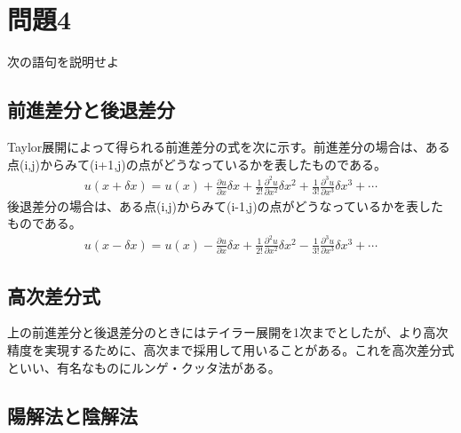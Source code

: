 \documentclass[a4j,twoside,openright,11pt]{jarticle}
\begin{document}
\section{問題4}
次の語句を説明せよ
\subsection{前進差分と後退差分}
Taylor展開によって得られる前進差分の式を次に示す。前進差分の場合は、ある点(i,j)からみて(i+1,j)の点がどうなっているかを表したものである。
\begin{eqnarray}
u(x+\delta x) = u(x) + \frac{\partial u}{\partial x}\delta x + \frac{1}{2!}\frac{\partial^2 u}{\partial x^2}\delta x^2 + \frac{1}{3!}\frac{\partial^3 u}{\partial x^3}\delta x^3 + \cdots
\end{eqnarray}
後退差分の場合は、ある点(i,j)からみて(i-1,j)の点がどうなっているかを表したものである。
\begin{eqnarray}
u(x-\delta x) = u(x) - \frac{\partial u}{\partial x}\delta x + \frac{1}{2!}\frac{\partial^2 u}{\partial x^2}\delta x^2 - \frac{1}{3!}\frac{\partial^3 u}{\partial x^3}\delta x^3 + \cdots
\end{eqnarray}

\subsection{高次差分式}
上の前進差分と後退差分のときにはテイラー展開を1次までとしたが、より高次精度を実現するために、高次まで採用して用いることがある。これを高次差分式といい、有名なものにルンゲ・クッタ法がある。

\subsection{陽解法と陰解法}
\end{document}
